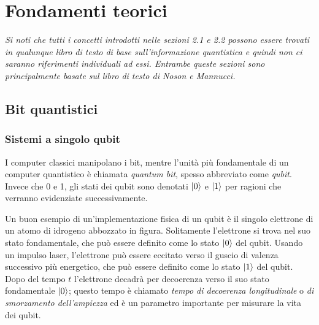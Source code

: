 \chapter{Fondamenti teorici}\label{ch:teoria}

\emph{
    Si noti che tutti i concetti introdotti nelle sezioni 2.1 e 2.2 possono essere trovati in 
    qualunque libro di testo di base sull'informazione quantistica e quindi non ci saranno 
    riferimenti individuali ad essi. Entrambe queste sezioni sono principalmente basate sul libro 
    di testo di Noson e Mannucci\cite{noson}.
}

\section{Bit quantistici}

\subsection{Sistemi a singolo qubit}

I computer classici manipolano i bit, mentre l'unità più fondamentale di un computer quantistico 
è chiamata \emph{quantum bit}, spesso abbreviato come \emph{qubit}. 
Invece che 0 e 1, gli stati dei qubit sono denotati $\ket{0}$ e $\ket{1}$ per ragioni che verranno 
evidenziate successivamente. 

Un buon esempio di un'implementazione fisica di un qubit è il singolo elettrone di un atomo di 
idrogeno abbozzato in figura. %
Solitamente l'elettrone si trova %
nel suo stato fondamentale, che può essere definito come lo stato $\ket{0}$ del qubit. 
Usando un impulso laser, l'elettrone può essere eccitato verso il guscio di valenza successivo più 
energetico, che può essere definito come lo stato $\ket{1}$  del qubit. Dopo del tempo $t$ 
l'elettrone decadrà per decoerenza verso il suo stato fondamentale $\ket{0}$; questo tempo è 
chiamato \emph{tempo di decoerenza longitudinale} o \emph{di smorzamento dell'ampiezza} ed è 
un parametro importante per misurare la vita dei qubit. %


